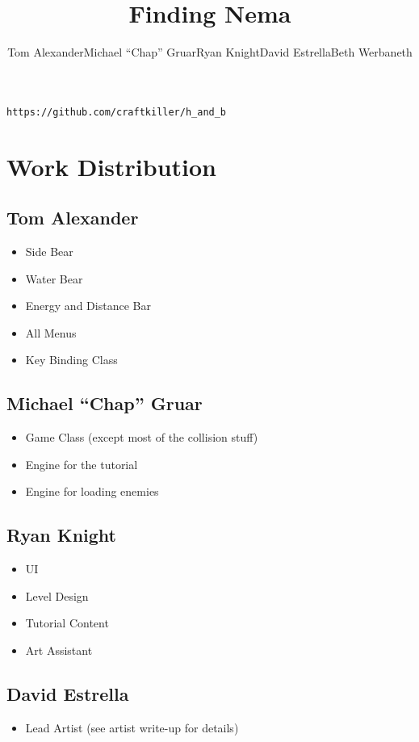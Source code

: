 \documentclass[12pt, letter]{article}
\title{Finding Nema}
\date{}
\author{\hspace{-10mm}\begin{tabular}{ c c c c c }
Tom Alexander & Michael ``Chap'' Gruar & Ryan Knight & David Estrella & Beth Werbaneth
\end{tabular}}
\begin{document}
\maketitle
\begin{center}
\begin{verbatim}
https://github.com/craftkiller/h_and_b
\end{verbatim}
\end{center}
\section{Work Distribution}
\subsection*{Tom Alexander}
\begin{itemize}
\item Side Bear
\item Water Bear
\item Energy and Distance Bar
\item All Menus
\item Key Binding Class
\end{itemize}
\subsection*{Michael ``Chap'' Gruar}
\begin{itemize}
\item Game Class (except most of the collision stuff)
\item Engine for the tutorial
\item Engine for loading enemies
\end{itemize}
\subsection*{Ryan Knight}
\begin{itemize}
\item UI
\item Level Design
\item Tutorial Content
\item Art Assistant
\end{itemize}
\subsection*{David Estrella}
\begin{itemize}
\item Lead Artist (see artist write-up for details)
\end{itemize}
\end{document}
